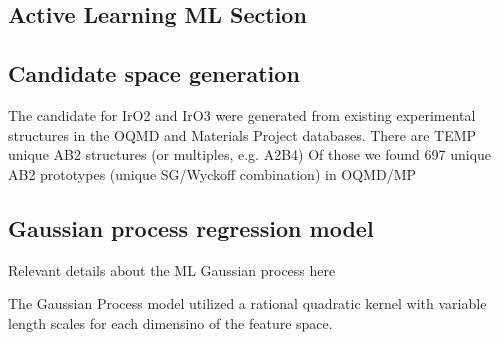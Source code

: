 
\subsection{Active Learning ML Section}  %

\subsection{Candidate space generation}
The candidate for IrO2 and IrO3 were generated from existing experimental structures in the OQMD and Materials Project databases.
%
There are TEMP unique AB2 structures (or multiples, e.g. A2B4)
%
Of those we found 697 unique AB2 prototypes (unique SG/Wyckoff combination) in OQMD/MP
%



\subsection{Gaussian process regression model}
Relevant details about the ML Gaussian process here  %

The Gaussian Process model utilized a rational quadratic kernel with variable length scales for each dimensino of the feature space.

